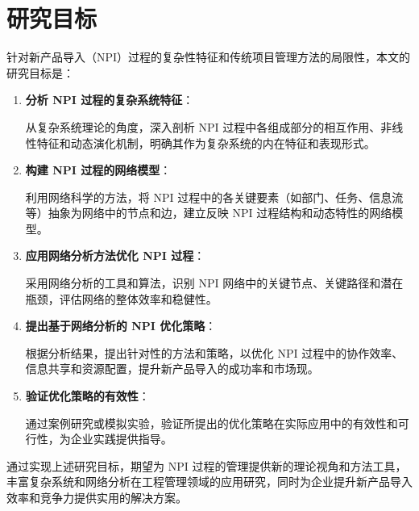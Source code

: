 \chapter{研究目标}

针对新产品导入（NPI）过程的复杂性特征和传统项目管理方法的局限性，本文的研究目标是：

\begin{enumerate}
  \item \textbf{分析 NPI 过程的复杂系统特征}：

  从复杂系统理论的角度，深入剖析 NPI 过程中各组成部分的相互作用、非线性特征和动态演化机制，明确其作为复杂系统的内在特征和表现形式。

  \item \textbf{构建 NPI 过程的网络模型}：

  利用网络科学的方法，将 NPI 过程中的各关键要素（如部门、任务、信息流等）抽象为网络中的节点和边，建立反映 NPI 过程结构和动态特性的网络模型。

  \item \textbf{应用网络分析方法优化 NPI 过程}：

  采用网络分析的工具和算法，识别 NPI 网络中的关键节点、关键路径和潜在瓶颈，评估网络的整体效率和稳健性。

  \item \textbf{提出基于网络分析的 NPI 优化策略}：

  根据分析结果，提出针对性的方法和策略，以优化 NPI 过程中的协作效率、信息共享和资源配置，提升新产品导入的成功率和市场现。

  \item \textbf{验证优化策略的有效性}：

  通过案例研究或模拟实验，验证所提出的优化策略在实际应用中的有效性和可行性，为企业实践提供指导。

\end{enumerate}

通过实现上述研究目标，期望为 NPI 过程的管理提供新的理论视角和方法工具，丰富复杂系统和网络分析在工程管理领域的应用研究，同时为企业提升新产品导入效率和竞争力提供实用的解决方案。
